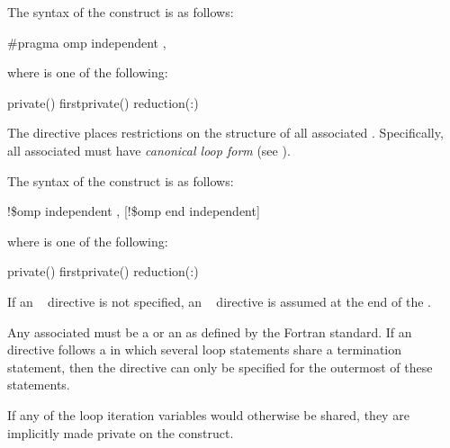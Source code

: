 \syntax
\begin{ccppspecific}
The syntax of the  construct is as follows:
\begin{boxedcode}
\#pragma omp independent \plc{[clause[ [},\plc{] clause] ... ] new-line}
\end{boxedcode}

where  is one of the following:

\begin{indentedcodelist}
private()
firstprivate()
reduction(:)
\end{indentedcodelist}
The  directive places restrictions on the structure of all associated . 
Specifically, all associated  must have \emph{canonical loop form} (see 
).
\end{ccppspecific}

\begin{fortranspecific}
The syntax of the  construct is as follows:

\begin{boxedcode}
!\$omp independent \plc{[clause[ [},\plc{] clause] ... ]}
[!\$omp end independent]
\end{boxedcode}

\begin{samepage}
where  is one of the following:

\begin{indentedcodelist}
private()
firstprivate()
reduction(:)
\end{indentedcodelist}
\end{samepage}

If an ~ directive is not specified, an
  ~ directive is assumed at the end of the 
.

Any associated  must be a  or an
 as defined by the Fortran standard. If
an ~ directive follows a  in
which several loop statements share a  termination statement,
then the directive can only be specified for the outermost of these
 statements.

If any of the loop iteration variables would otherwise be shared, they are implicitly 
  made private on the  construct.
\end{fortranspecific}

